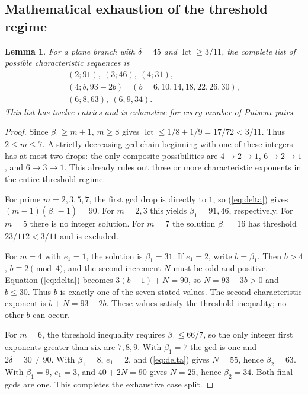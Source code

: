 \documentclass[11pt]{article}
\newtheorem{lemma}[theorem]{Lemma}
\theoremstyle{remark}\newtheorem{remark}[theorem]{Remark}
\newcommand{\lct}{\operatorname{lct}}\newcommand{\Sing}{\operatorname{Sing}}
\begin{document}
\subsection{Mathematical exhaustion of the threshold regime}
\begin{lemma}\label{lem:12}
For a plane branch with $\delta=45$ and $\lct\geq3/11$, the complete list of possible characteristic sequences is
\[
\begin{gathered}
(2;91),\ (3;46),\ (4;31),\\
(4;b,93-2b)\quad (b=6,10,14,18,22,26,30),\\
(6;8,63),\ (6;9,34).
\end{gathered}
\]
This list has twelve entries and is exhaustive for every number of Puiseux pairs.
\end{lemma}
\begin{proof}
Since $\beta_1\geq m+1$, $m\geq8$ gives
$\lct\leq1/8+1/9=17/72<3/11$. Thus $2\leq m\leq7$. A strictly decreasing gcd chain beginning with one of these integers has at most two drops: the only composite possibilities are $4\to2\to1$, $6\to2\to1$, and $6\to3\to1$. This already rules out three or more characteristic exponents in the entire threshold regime.

For prime $m=2,3,5,7$, the first gcd drop is directly to $1$, so (\ref{eq:delta}) gives $(m-1)(\beta_1-1)=90$. For $m=2,3$ this yields $\beta_1=91,46$, respectively. For $m=5$ there is no integer solution. For $m=7$ the solution $\beta_1=16$ has threshold $23/112<3/11$ and is excluded.

For $m=4$ with $e_1=1$, the solution is $\beta_1=31$. If $e_1=2$, write $b=\beta_1$. Then $b>4$, $b\equiv2\pmod4$, and the second increment $N$ must be odd and positive. Equation (\ref{eq:delta}) becomes
$3(b-1)+N=90$, so $N=93-3b>0$ and $b\leq30$. Thus $b$ is exactly one of the seven stated values. The second characteristic exponent is $b+N=93-2b$. These values satisfy the threshold inequality; no other $b$ can occur.

For $m=6$, the threshold inequality requires $\beta_1\leq66/7$, so the only integer first exponents greater than six are $7,8,9$. With $\beta_1=7$ the gcd is one and $2\delta=30\ne90$. With $\beta_1=8$, $e_1=2$, and (\ref{eq:delta}) gives $N=55$, hence $\beta_2=63$. With $\beta_1=9$, $e_1=3$, and $40+2N=90$ gives $N=25$, hence $\beta_2=34$. Both final gcds are one. This completes the exhaustive case split.
\end{proof}
\end{document}
